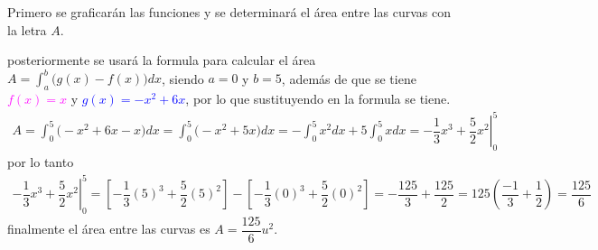 \documentclass[legalpaper, 12pt]{exam}
\begin{document}
\begin{solution}
Primero se graficarán las funciones y se determinará el área entre las curvas con la letra $A$.
\begin{center}
\end{center}
posteriormente se usará la formula para calcular el área $A = \int_a^b\Big(g(x) - f(x) \Big) dx$, siendo $a=0$ y $b=5$, además de que se tiene \textcolor{magenta}{$f(x) = x$} y \textcolor{blue}{$g(x) = -x^2+6x$}, por lo que sustituyendo en la formula se tiene.
\begin{align*}
A = \int_0^5\Big(-x^2+6x - x \Big) dx = \int_0^5\Big(-x^2+5x\Big) dx = -\int_0^5 x^2 dx + 5\int_0^5 x dx = \left.-\dfrac{1}{3}x^3+\dfrac{5}{2}x^2\right|_0^5
\end{align*}
por lo tanto
\begin{align*}
\left.-\dfrac{1}{3}x^3+\dfrac{5}{2}x^2\right|_0^5 = \left[-\dfrac{1}{3}(5)^3+\dfrac{5}{2}(5)^2\right] - \left[-\dfrac{1}{3}(0)^3+\dfrac{5}{2}(0)^2\right] = -\dfrac{125}{3} + \dfrac{125}{2} = 125\left(\dfrac{-1}{3} + \dfrac{1}{2}\right) = \dfrac{125}{6}
\end{align*}
finalmente el área entre las curvas es $A = \dfrac{125}{6} u^2$.
\end{solution}
\end{document}
